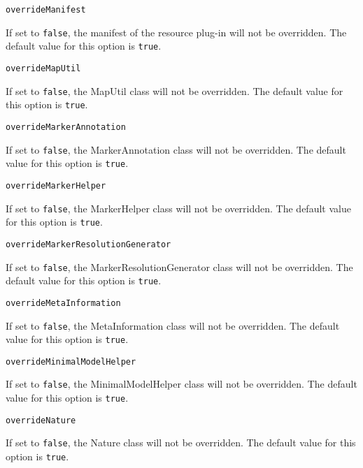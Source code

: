 \noindent\texttt{overrideManifest}
\begin{myindentpar}{1cm}
If set to \texttt{false}, the manifest of the resource plug-in will not be overridden. The default value for this option is \texttt{true}.
\end{myindentpar}

\noindent\texttt{overrideMapUtil}
\begin{myindentpar}{1cm}
If set to \texttt{false}, the MapUtil class will not be overridden. The default value for this option is \texttt{true}.
\end{myindentpar}

\noindent\texttt{overrideMarkerAnnotation}
\begin{myindentpar}{1cm}
If set to \texttt{false}, the MarkerAnnotation class will not be overridden. The default value for this option is \texttt{true}.
\end{myindentpar}

\noindent\texttt{overrideMarkerHelper}
\begin{myindentpar}{1cm}
If set to \texttt{false}, the MarkerHelper class will not be overridden. The default value for this option is \texttt{true}.
\end{myindentpar}

\noindent\texttt{overrideMarkerResolutionGenerator}
\begin{myindentpar}{1cm}
If set to \texttt{false}, the MarkerResolutionGenerator class will not be overridden. The default value for this option is \texttt{true}.
\end{myindentpar}

\noindent\texttt{overrideMetaInformation}
\begin{myindentpar}{1cm}
If set to \texttt{false}, the MetaInformation class will not be overridden. The default value for this option is \texttt{true}.
\end{myindentpar}

\noindent\texttt{overrideMinimalModelHelper}
\begin{myindentpar}{1cm}
If set to \texttt{false}, the MinimalModelHelper class will not be overridden. The default value for this option is \texttt{true}.
\end{myindentpar}

\noindent\texttt{overrideNature}
\begin{myindentpar}{1cm}
If set to \texttt{false}, the Nature class will not be overridden. The default value for this option is \texttt{true}.
\end{myindentpar}

